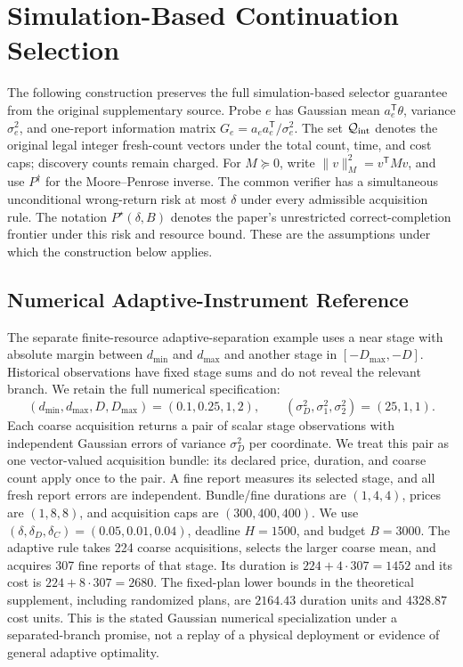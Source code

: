 \documentclass[11pt,a4paper]{article}
\newcommand{\T}{\mathsf{T}}
\begin{document}


\section{Simulation-Based Continuation Selection}
The following construction preserves the full simulation-based selector guarantee from the original supplementary source. Probe $e$ has Gaussian mean $a_e^\T\theta$, variance $\sigma_e^2$, and one-report information matrix $G_e=a_ea_e^\T/\sigma_e^2$. The set $\mathcal Q_{\rm int}$ denotes the original legal integer fresh-count vectors under the total count, time, and cost caps; discovery counts remain charged. For $M\succeq0$, write $\|v\|_M^2=v^\T Mv$, and use $P^\dagger$ for the Moore--Penrose inverse. The common verifier has a simultaneous unconditional wrong-return risk at most $\delta$ under every admissible acquisition rule. The notation $P^\star(\delta,B)$ denotes the paper's unrestricted correct-completion frontier under this risk and resource bound. These are the assumptions under which the construction below applies.



\subsection{Numerical Adaptive-Instrument Reference}
The separate finite-resource adaptive-separation example uses a near stage with absolute margin between $d_{\min}$ and $d_{\max}$ and another stage in $[-D_{\max},-D]$. Historical observations have fixed stage sums and do not reveal the relevant branch. We retain the full numerical specification:
$$
(d_{\min},d_{\max},D,D_{\max})=(0.1,0.25,1,2),\qquad
(\sigma_D^2,\sigma_1^2,\sigma_2^2)=(25,1,1).
$$
Each coarse acquisition returns a pair of scalar stage observations with independent Gaussian errors of variance $\sigma_D^2$ per coordinate. We treat this pair as one vector-valued acquisition bundle: its declared price, duration, and coarse count apply once to the pair. A fine report measures its selected stage, and all fresh report errors are independent. Bundle/fine durations are $(1,4,4)$, prices are $(1,8,8)$, and acquisition caps are $(300,400,400)$. We use $(\delta,\delta_D,\delta_C)=(0.05,0.01,0.04)$, deadline $H=1500$, and budget $B=3000$. The adaptive rule takes 224 coarse acquisitions, selects the larger coarse mean, and acquires 307 fine reports of that stage. Its duration is $224+4\cdot307=1452$ and its cost is $224+8\cdot307=2680$. The fixed-plan lower bounds in the theoretical supplement, including randomized plans, are $2164.43$ duration units and $4328.87$ cost units. This is the stated Gaussian numerical specialization under a separated-branch promise, not a replay of a physical deployment or evidence of general adaptive optimality.
\end{document}
